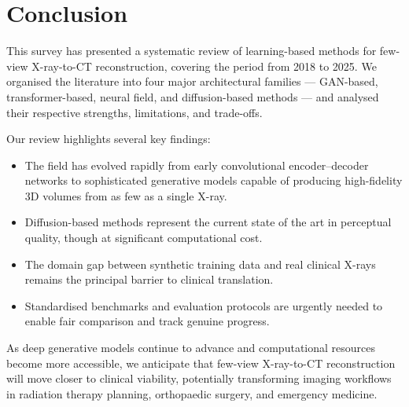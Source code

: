 
\section{Conclusion}
\label{sec:conclusion}

This survey has presented a systematic review of learning-based methods for few-view X-ray-to-CT reconstruction, covering the period from 2018 to 2025. We organised the literature into four major architectural families — GAN-based, transformer-based, neural field, and diffusion-based methods — and analysed their respective strengths, limitations, and trade-offs.

Our review highlights several key findings:

\begin{itemize}
  \item The field has evolved rapidly from early convolutional encoder--decoder networks to sophisticated generative models capable of producing high-fidelity 3D volumes from as few as a single X-ray.
  \item Diffusion-based methods represent the current state of the art in perceptual quality, though at significant computational cost.
  \item The domain gap between synthetic training data and real clinical X-rays remains the principal barrier to clinical translation.
  \item Standardised benchmarks and evaluation protocols are urgently needed to enable fair comparison and track genuine progress.
\end{itemize}

As deep generative models continue to advance and computational resources become more accessible, we anticipate that few-view X-ray-to-CT reconstruction will move closer to clinical viability, potentially transforming imaging workflows in radiation therapy planning, orthopaedic surgery, and emergency medicine.

